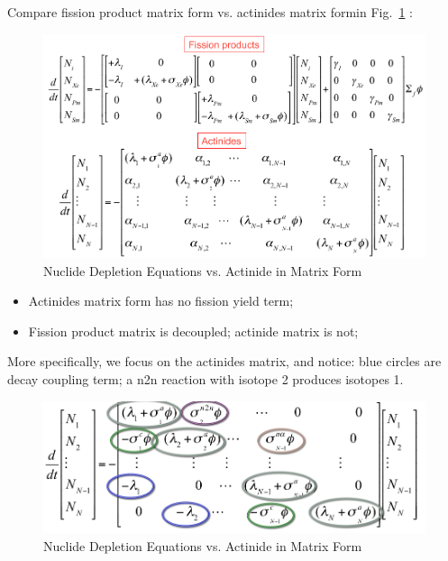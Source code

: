 \documentclass{school-22.211-notes}
\begin{document}
Compare fission product matrix form vs. actinides matrix formin Fig.~\ref{fp-an-matrix-form} : 
\begin{figure}[ht]
  \centering
  \includegraphics[width=5in]{images/dfs/fp-an-matrix-form.png}
  \caption{Nuclide Depletion Equations vs. Actinide in Matrix Form} \label{fp-an-matrix-form}
\end{figure}
\begin{itemize}
\item Actinides matrix form has no fission yield term;
\item Fission product matrix is decoupled; actinide matrix is not; 
\end{itemize}


More specifically, we focus on the actinides matrix, and notice: blue circles are decay coupling term; a n2n reaction with isotope 2 produces isotopes 1. 

\begin{figure}[ht]
  \centering
  \includegraphics[width=5in]{images/dfs/nuclide-depletion-matrix-form.png}
  \caption{Nuclide Depletion Equations vs. Actinide in Matrix Form} \label{nuclide-depletion-matrix} 
    \end{figure}
\end{document}
